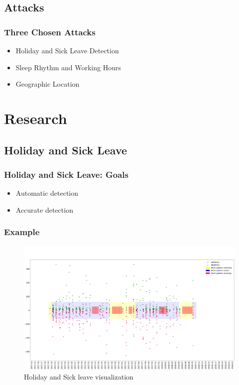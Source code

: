 \documentclass{beamer}
\begin{document}
\subsection{Attacks}
\begin{frame}
    \frametitle{Three Chosen Attacks}
    \begin{itemize}
        \item Holiday and Sick Leave Detection
        \pause{}
        \item Sleep Rhythm and Working Hours
        \pause{}
        \item Geographic Location
    \end{itemize}
\end{frame}

\section{Research}
\subsection{Holiday and Sick Leave}
\begin{frame}
    \frametitle{Holiday and Sick Leave: Goals}
    \begin{itemize}
        \item Automatic detection
        \pause{}
        \item Accurate detection
    \end{itemize}
\end{frame}

\begin{frame}
    \frametitle{Example}
    \begin{figure}[H]
        \includegraphics[scale=0.115]{analysis/work-time-analysis}
        \centering
        \caption{Holiday and Sick leave visualization}
    \end{figure}
\end{frame}
\end{document}

